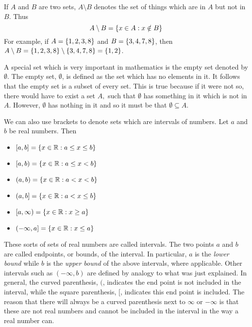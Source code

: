 If $A$ and $B$ are two sets, $A\setminus B$\index{$\setminus$} denotes the set of things which
are in $A$ but not in $B.$ Thus
\begin{equation*}
A\setminus B =  \{x\in A:x\notin B\} 
\end{equation*}
For example, if $A = \{1,2,3,8 \}$ and $B = \{3,4,7,8 \}$, then $A \setminus B = \{1,2,3,8\} \setminus 
\{3,4,7,8 \} =\{1,2 \}$.

A special set which is very important in mathematics is the empty set denoted by $\emptyset .$ The empty set, $\emptyset $, is
defined as the set which has no elements in it. It follows that the empty set is a subset of every set. 
This is true because if it were not so, there would have to exist a set $A,$ such that $\emptyset $
has something in it which is not in $A.$ However, $\emptyset $ has nothing
in it and so it must be that $\emptyset \subseteq A.$

We can also use brackets to denote sets which are intervals of numbers. Let $a$ and $b$ be real numbers. Then

\begin{itemize}
\item
$\left[ a,b\right] = \{x \in \mathbb{R}: a\leq x\leq b\}$

\item $\left[a,b \right) = \{x \in \mathbb{R}: a\leq x<b\}$ 

\item $\left( a,b\right) = \{x \in \mathbb{R}: a<x<b\}$ 

\item $(a,b] = \{x \in \mathbb{R}: a<x\leq b\}$

\item  $[a,\infty ) = \{x \in \mathbb{R}: x\geq a\}$ 

\item $(-\infty ,a] = \{x \in \mathbb{R}: x \leq a\}$ 
\end{itemize}

These sorts of sets of real
numbers are called intervals. The two points $a$ and $b$ are called
endpoints, or bounds, of the interval. In particular, $a$ is the {\em lower bound \em}  while $b$ is the {\em upper bound \em} of the above
intervals, where applicable. Other intervals such as $\left( -\infty ,b\right) $
are defined by analogy to what was just explained.
 In general, the curved
parenthesis, $($, indicates the end point is not included in the interval, while
the square parenthesis, $[$, indicates this end point is included. The reason that
there will always be a curved parenthesis next to $\infty $ or $-\infty $ is
that these are not real numbers and cannot be included in the interval in the way a real number can. 

